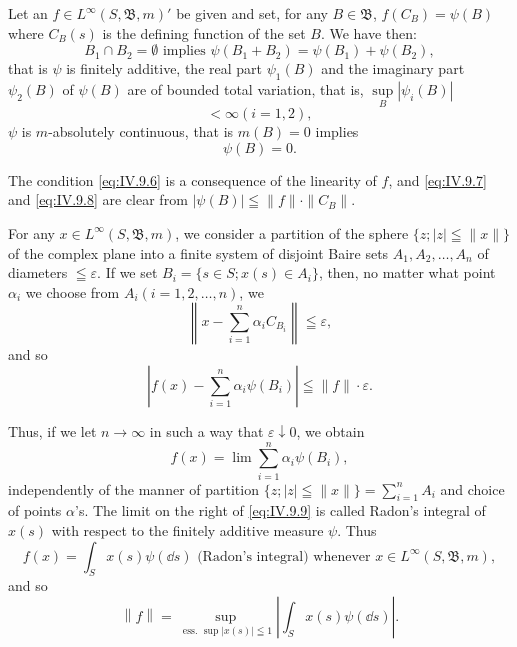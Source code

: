 Let an $f \in L^{\infty}(S, \mathfrak{B}, m)'$ be given and set, for any $B \in \mathfrak{B}$, $f(C_B) = \psi(B)$ where $C_B(s)$ is the defining function of the set $B$. We have then: 
\begin{equation}\label{eq:IV.9.6}
B _{1} \cap B _{2} = \emptyset \text{ implies } \psi (B _{1} + B _{2}) = \psi (B _{1}) + \psi (B _{2}),
\end{equation}
that is $\psi$ is finitely additive, 
the real part $\psi_{1}(B)$ and the imaginary part $\psi_{2}(B)$ of 
$\psi (B)$ are of bounded total variation, that is, $\sup\limits_B |\psi_i(B)|$ 
\begin{equation}\label{eq:IV.9.7}
< \infty (i = 1, 2),
\end{equation}
$\psi$ is $m$-absolutely continuous, that is $m(B) = 0$ implies 
\begin{equation}\label{eq:IV.9.8}
\psi (B) = 0.
\end{equation}

The condition \eqref{eq:IV.9.6} is a consequence of the linearity of $f$, and \eqref{eq:IV.9.7} and \eqref{eq:IV.9.8} are clear from $|\psi(B)| \leqq \|f\| \cdot \|C_B\|$. 

For any $x \in L^{\infty}(S, \mathfrak{B}, m)$, we consider a partition of the sphere $\{z; |z| \leqq \|x\|\}$ of the complex plane into a finite system of disjoint Baire sets $A_{1}, A_{2}, \ldots, A_{n}$ of diameters $\leqq \varepsilon$. If we set $B_{i} = \{s \in S; x(s) \in A_{i}\}$, then, no matter what point $\alpha_{i}$ we choose from $A_{i} (i = 1, 2, \ldots, n)$, we 
\[
\left\| x - \sum\limits_{i=1} ^{n} \alpha_{i} C _ {B _{i}} \right\| \leqq \varepsilon ,
\]
and so 
\[
\left| f (x) - \sum\limits_{i=1} ^{n} \alpha_{i} \psi (B _{i}) \right| \leqq \| f \| \cdot \varepsilon .
\]

Thus, if we let $n \to \infty$ in such a way that $\varepsilon \downarrow 0$, we obtain 
\begin{equation}\label{eq:IV.9.9}
f (x) = \lim \sum_{i=1}^{n} \alpha_{i} \psi (B _{i}),
\end{equation}
independently of the manner of partition $\{z; |z| \leqq \|x\|\} = \sum\limits_{i=1}^{n} A_i$ and choice of points $\alpha$'s. The limit on the right of \eqref{eq:IV.9.9} is called Radon's integral of $x(s)$ with respect to the finitely additive measure $\psi$. Thus 
\begin{equation}\label{eq:IV.9.10}
f(x) = \int_{S} x(s) \psi(\dd s) \text{ (Radon's integral) whenever } x \in L^{\infty}(S, \mathfrak{B}, m),
\end{equation}
and so 
\begin{equation}\label{eq:IV.9.11}
\left\| f \right\| = \sup\limits _ {\text{ ess. } \sup | x (s) | \leqq 1} \left| \int_{S} x (s) \psi (\dd s) \right|.
\end{equation}

